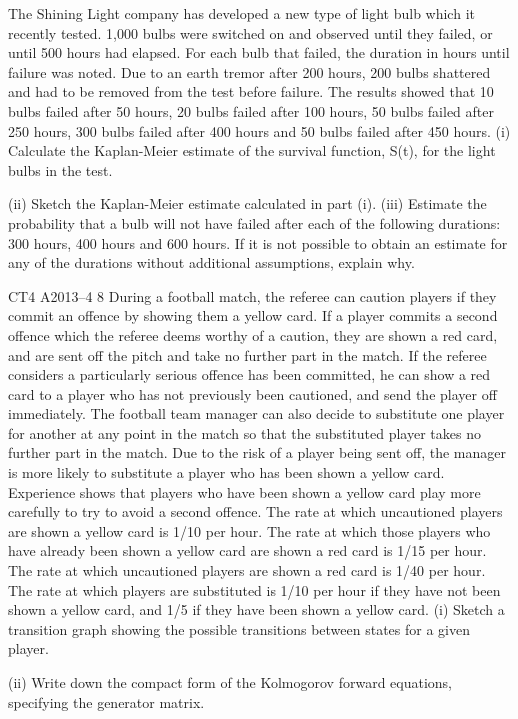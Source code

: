 

The Shining Light company has developed a new type of light bulb which it recently
tested. 1,000 bulbs were switched on and observed until they failed, or until 500
hours had elapsed. For each bulb that failed, the duration in hours until failure was
noted. Due to an earth tremor after 200 hours, 200 bulbs shattered and had to be
removed from the test before failure.
The results showed that 10 bulbs failed after 50 hours, 20 bulbs failed after 100 hours,
50 bulbs failed after 250 hours, 300 bulbs failed after 400 hours and 50 bulbs failed
after 450 hours.
(i) Calculate the Kaplan-Meier estimate of the survival function, S(t), for the light
bulbs in the test.

(ii) Sketch the Kaplan-Meier estimate calculated in part (i).
(iii) Estimate the probability that a bulb will not have failed after each of the
following durations: 300 hours, 400 hours and 600 hours. If it is not possible
to obtain an estimate for any of the durations without additional assumptions,
explain why.

CT4 A2013–4
8
During a football match, the referee can caution players if they commit an offence by
showing them a yellow card. If a player commits a second offence which the referee
deems worthy of a caution, they are shown a red card, and are sent off the pitch and
take no further part in the match. If the referee considers a particularly serious
offence has been committed, he can show a red card to a player who has not
previously been cautioned, and send the player off immediately.
The football team manager can also decide to substitute one player for another at any
point in the match so that the substituted player takes no further part in the match.
Due to the risk of a player being sent off, the manager is more likely to substitute a
player who has been shown a yellow card. Experience shows that players who have
been shown a yellow card play more carefully to try to avoid a second offence.
The rate at which uncautioned players are shown a yellow card is 1/10 per hour.
The rate at which those players who have already been shown a yellow card are
shown a red card is 1/15 per hour.
The rate at which uncautioned players are shown a red card is 1/40 per hour.
The rate at which players are substituted is 1/10 per hour if they have not been shown
a yellow card, and 1/5 if they have been shown a yellow card.
(i) Sketch a transition graph showing the possible transitions between states for a
given player.

(ii) Write down the compact form of the Kolmogorov forward equations,
specifying the generator matrix.

